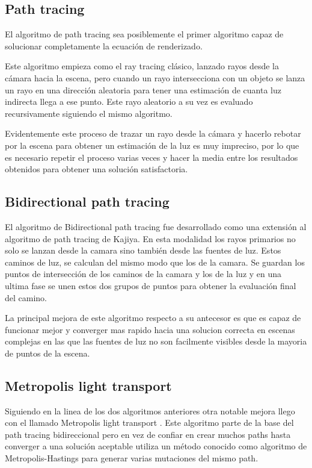 \clearpage

\subsection{Path tracing}

El algoritmo de path tracing \cite{Kajiya1986} sea posiblemente el primer algoritmo capaz de solucionar completamente la ecuación de renderizado.

\medskip
Este algoritmo empieza como el ray tracing clásico, lanzado rayos desde la cámara hacia la escena, pero cuando un rayo intersecciona con un objeto se lanza un rayo en una dirección aleatoria para tener una estimación de cuanta luz indirecta llega a ese punto. Este rayo aleatorio a su vez es evaluado recursivamente siguiendo el mismo algoritmo. 

\medskip 
Evidentemente este proceso de trazar un rayo desde la cámara y hacerlo rebotar por la escena para obtener un estimación de la luz es muy impreciso, por lo que es necesario repetir el proceso varias veces y hacer la media entre los resultados obtenidos para obtener  una solución satisfactoria. 

\subsection{Bidirectional path tracing}

El algoritmo de Bidirectional path tracing \cite{Lafortune1993} fue desarrollado como una extensión al algoritmo de path tracing de Kajiya. En esta modalidad los rayos primarios no solo se lanzan desde la camara sino también desde las fuentes de luz. Estos caminos de luz, se calculan del mismo modo que los de la camara. Se guardan los puntos de intersección de los caminos de la camara y los de la luz y en una ultima fase se unen estos dos grupos de puntos para obtener la evaluación final del camino.

\medskip
La principal mejora de este algoritmo respecto a su antecesor es que es capaz de funcionar mejor y converger mas rapido hacia una solucion correcta en escenas complejas en las que las fuentes de luz no son facilmente visibles desde la mayoria de puntos de la escena.

\subsection{Metropolis light transport}

Siguiendo en la linea de los dos algoritmos anteriores otra notable mejora llego con el llamado Metropolis light transport \cite{Veach1997}. Este algoritmo parte de la base del path tracing bidireccional pero en vez de confiar en crear muchos paths hasta converger a una solución aceptable utiliza un método conocido como algoritmo de Metropolis-Hastings para generar varias mutaciones del mismo path. 


